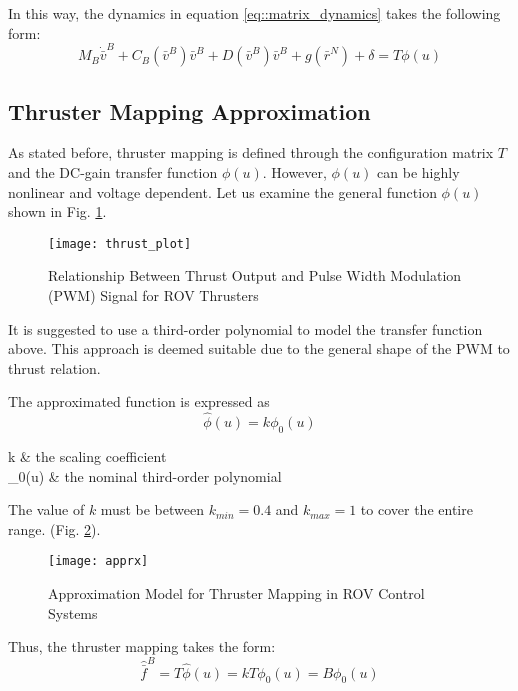     In this way, the dynamics in equation \ref{eq::matrix_dynamics} takes the following form:
    \begin{equation}
        M_B \dot{\bar{v}}^B + C_B(\bar{v}^B) \bar{v}^B+D(\bar{v}^B) \bar{v}^B+g(\bar{r}^N)
            + \delta = T\phi(u)
    \end{equation}

\subsection{Thruster Mapping Approximation}
    As stated before, thruster mapping is defined through the configuration 
    matrix $T$ and the DC-gain transfer function $\phi(u)$. However, $\phi(u)$ 
    can be highly nonlinear and voltage dependent. 
    Let us examine the general function $\phi(u)$ shown in Fig. \ref{image:thrust}.
    \begin{figure}[H]
        \centering\texttt{[image: thrust\_plot]}
        \caption{Relationship Between Thrust Output and Pulse Width Modulation (PWM) Signal for ROV Thrusters}
        \label{image:thrust}
    \end{figure}
    It is suggested to use a third-order polynomial to model the transfer function above. 
    This approach is deemed suitable due to the general shape of the PWM to thrust relation.
    
    The approximated function is expressed as 
    \begin{equation}
        \hat{\phi}(u) = k\phi_0(u)   
    \end{equation}
    \begin{conditions}
        \text{\quad}k & the scaling coefficient\\
        \phi_0(u) & the nominal third-order polynomial
    \end{conditions} 
    \vspace{0.5cm}

    The value of $k$ must be between $k_{min} = 0.4$ and $k_{max} = 1$ to cover the 
    entire range.
    (Fig. \ref{image:thrust_apprx}).
    \begin{figure}[H]
        \centering\texttt{[image: apprx]}
        \caption{Approximation Model for Thruster Mapping in ROV Control Systems}
        \label{image:thrust_apprx}
    \end{figure}
    
    Thus, the thruster mapping takes the form:
    \begin{equation}
        \hat{\bar{f}}^B=T\hat{\phi}(u) = kT\phi_0(u) = B\phi_0(u)
    \end{equation}

